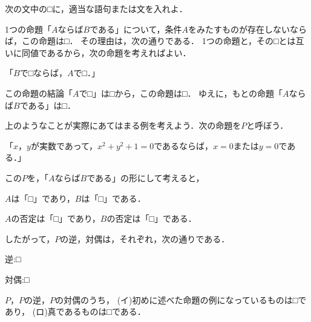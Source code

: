 \documentclass[../../main.tex]{subfiles}
\begin{document}
次の文中の□に，適当な語句または文を入れよ．

1つの命題「$A$ならば$B$である」について，条件$A$をみたすものが存在しないならば，この命題は□．
その理由は，次の通りである．
1つの命題と，その□とは互いに同値であるから，次の命題を考えればよい．
\begin{center}
  「$B$で□ならば，$A$で□．」
\end{center}
この命題の結論「$A$で□」は□から，この命題は□．
ゆえに，もとの命題「$A$ならば$B$である」は□．

上のようなことが実際にあてはまる例を考えよう．次の命題を$P$と呼ぼう．
\begin{center}
  「$x$，$y$が実数であって，$x^2+y^2+1=0$であるならば，$x=0$または$y=0$である．」
\end{center}
この$P$を，「$A$ならば$B$である」の形にして考えると，

$A$は「□」であり，$B$は「□」である．

$A$の否定は「□」であり，$B$の否定は「□」である．

したがって，$P$の逆，対偶は，それぞれ，次の通りである．
\begin{center}
  逆:□

  対偶:□
\end{center}
$P$，$P$の逆，$P$の対偶のうち，
(イ)初めに述べた命題の例になっているものは□であり，
(ロ)真であるものは□である．
\end{document}
